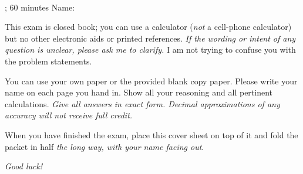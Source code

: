 \documentclass[11pt]{exam}
\begin{document}
\noindent
\textbf{{\large \courseID \\ \assignmentID}}

\noindent
\dateID; 60 minutes  \hfill Name: \underline{\hspace{3in}} 

\addpoints

\noindent
This exam is closed book; you can use a calculator (\emph{not} a cell-phone calculator) but no other electronic aids or printed references. \emph{If the wording or intent of any question is unclear, please ask me to clarify.} I am not trying to confuse you with the problem statements.

You can use your own paper or the provided blank copy paper. Please write your name on each page you hand in. Show all your reasoning and all pertinent calculations. \emph{Give all answers in exact form. Decimal approximations of any accuracy will not receive full credit.}

When you have finished the exam, place this cover sheet on top of it and fold the packet in half \emph{the long way, with your name facing out}.



\begin{figure}[h]
\centering
\end{figure}

\begin{center}
    \gradetable
\end{center}


\begin{center}
    {\Large \emph{Good luck!}}
\end{center}

\newpage
\end{document}
